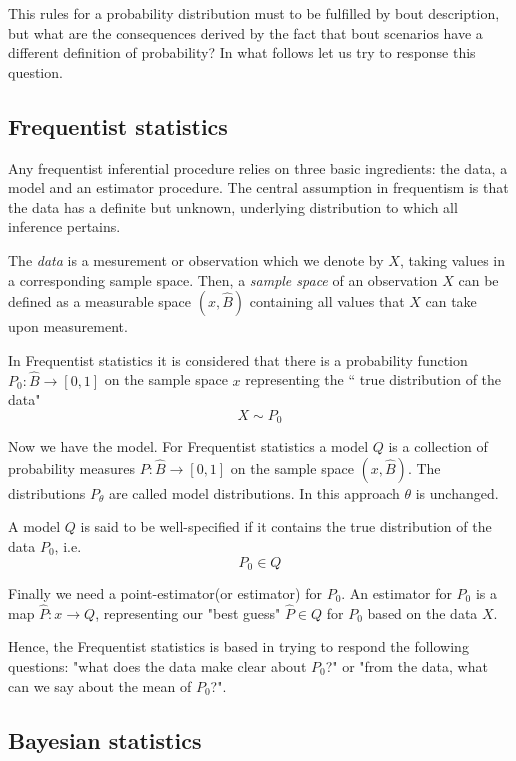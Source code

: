 \documentclass[onecolumn,           %
               showpacs,            %
               preprintnumbers,     %
               aps,                 %
               prl,          	    %
               letterpaper,             %
               superscriptaddress,      %
               nofootinbib,         %
               tightenlines,        %
               floats,floatfix      %
               ,usenatbib,
               ]{revtex4-1}
\begin{document}
This rules for a probability distribution must to be fulfilled by bout description, but what are the consequences derived by the fact that bout scenarios have a different definition of probability? In what follows let us try to response this question.

\subsection{Frequentist statistics}

Any frequentist inferential procedure relies on three basic ingredients: the data, a model and an estimator procedure. The central assumption in frequentism is that the data has a definite but unknown, underlying distribution to which all inference pertains.

The \textit{data} is a mesurement or observation which we denote by $X$, taking values in a corresponding sample space. Then, a \textit{sample space} of an observation $X$ can be defined as a measurable space $(x,\hat B)$ containing all values that $X$ can take upon measurement.

In Frequentist statistics it is considered that there is a probability function $P_0:\hat B\rightarrow [0,1]$ on the sample space $x$ representing the `` true distribution of the data"
\[X\sim P_0\]

Now we have the model. For Frequentist statistics a model $Q$ is a collection of probability measures $P:\hat B\rightarrow[0,1]$ on the sample space $(x,\hat B)$. The distributions $P_\theta$ are called model distributions. In this approach $\theta$ is unchanged. 

A model $Q$ is said to be well-specified if it contains the true distribution of the data $P_0$, i.e.
\[P_0\in Q\]

Finally we need a point-estimator(or estimator) for $P_0$. An estimator for $P_0$ is a map $\hat P:x\rightarrow Q$, representing our "best guess" $\hat P\in Q$ for $P_0$ based on the data $X$.

Hence, the Frequentist statistics is based in trying to respond the following questions: "what does the data make clear about $P_0$?" or "from the data, what can we say about the mean of $P_0$?".

\subsection{Bayesian statistics}
\end{document}
